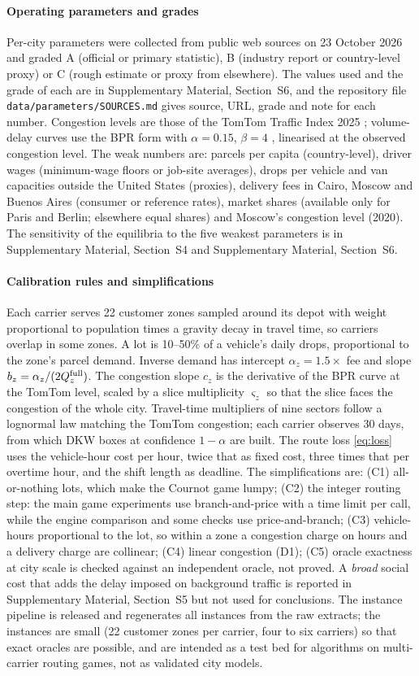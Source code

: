 \documentclass[preprint,11pt]{elsarticle}
\theoremstyle{definition}
\theoremstyle{remark}
\newcommand{\SM}[1]{Supplementary Material, Section~#1}
\begin{document}
\paragraph{Operating parameters and grades} Per-city parameters were collected from public web sources on 23 October 2026 and graded A (official or primary statistic), B (industry report or country-level proxy) or C (rough estimate or proxy from elsewhere). The values used and the grade of each are in \SM{S6}, and the repository file \texttt{data/parameters/SOURCES.md} gives source, URL, grade and note for each number. Congestion levels are those of the TomTom Traffic Index 2025 \citep{TomTom2025}; volume-delay curves use the BPR form with $\alpha=0.15$, $\beta=4$ \citep{BPR1964}, linearised at the observed congestion level. The weak numbers are: parcels per capita (country-level), driver wages (minimum-wage floors or job-site averages), drops per vehicle and van capacities outside the United States (proxies), delivery fees in Cairo, Moscow and Buenos Aires (consumer or reference rates), market shares (available only for Paris and Berlin; elsewhere equal shares) and Moscow's congestion level (2020). The sensitivity of the equilibria to the five weakest parameters is in \SM{S4} and \SM{S6}.

\paragraph{Calibration rules and simplifications} Each carrier serves 22 customer zones sampled around its depot with weight proportional to population times a gravity decay in travel time, so carriers overlap in some zones. A lot is 10--50\% of a vehicle's daily drops, proportional to the zone's parcel demand. Inverse demand has intercept $\alpha_z=1.5\times$ fee and slope $b_z=\alpha_z/(2Q_z^{\rm full})$. The congestion slope $c_z$ is the derivative of the BPR curve at the TomTom level, scaled by a slice multiplicity $\varsigma_z$ so that the slice faces the congestion of the whole city. Travel-time multipliers of nine sectors follow a lognormal law matching the TomTom congestion; each carrier observes 30 days, from which DKW boxes at confidence $1-\alpha$ are built. The route loss \eqref{eq:loss} uses the vehicle-hour cost per hour, twice that as fixed cost, three times that per overtime hour, and the shift length as deadline. The simplifications are:
(C1) all-or-nothing lots, which make the Cournot game lumpy; (C2) the integer routing step: the main game experiments use branch-and-price with a time limit per call, while the engine comparison and some checks use price-and-branch; (C3) vehicle-hours proportional to the lot, so within a zone a congestion charge on hours and a delivery charge are collinear; (C4) linear congestion (D1); (C5) oracle exactness at city scale is checked against an independent oracle, not proved. A \emph{broad} social cost that adds the delay imposed on background traffic is reported in \SM{S5} but not used for conclusions. The instance pipeline is released and regenerates all instances from the raw extracts; the instances are small (22 customer zones per carrier, four to six carriers) so that exact oracles are possible, and are intended as a test bed for algorithms on multi-carrier routing games, not as validated city models.
\end{document}
